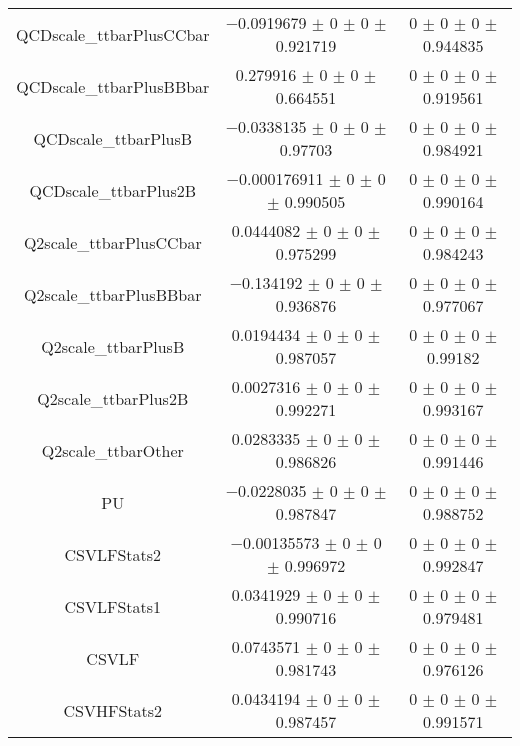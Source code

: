 \begin{table}
\begin{tabular}{ccc}
QCDscale\_ttbarPlusCCbar & \num{-0.0919679} $\pm$ \num{0} $\pm$ \num{0} $\pm$ \num{0.921719} & \num{0} $\pm$ \num{0} $\pm$ \num{0} $\pm$ \num{0.944835}\\
QCDscale\_ttbarPlusBBbar & \num{0.279916} $\pm$ \num{0} $\pm$ \num{0} $\pm$ \num{0.664551} & \num{0} $\pm$ \num{0} $\pm$ \num{0} $\pm$ \num{0.919561}\\
QCDscale\_ttbarPlusB & \num{-0.0338135} $\pm$ \num{0} $\pm$ \num{0} $\pm$ \num{0.97703} & \num{0} $\pm$ \num{0} $\pm$ \num{0} $\pm$ \num{0.984921}\\
QCDscale\_ttbarPlus2B & \num{-0.000176911} $\pm$ \num{0} $\pm$ \num{0} $\pm$ \num{0.990505} & \num{0} $\pm$ \num{0} $\pm$ \num{0} $\pm$ \num{0.990164}\\
Q2scale\_ttbarPlusCCbar & \num{0.0444082} $\pm$ \num{0} $\pm$ \num{0} $\pm$ \num{0.975299} & \num{0} $\pm$ \num{0} $\pm$ \num{0} $\pm$ \num{0.984243}\\
Q2scale\_ttbarPlusBBbar & \num{-0.134192} $\pm$ \num{0} $\pm$ \num{0} $\pm$ \num{0.936876} & \num{0} $\pm$ \num{0} $\pm$ \num{0} $\pm$ \num{0.977067}\\
Q2scale\_ttbarPlusB & \num{0.0194434} $\pm$ \num{0} $\pm$ \num{0} $\pm$ \num{0.987057} & \num{0} $\pm$ \num{0} $\pm$ \num{0} $\pm$ \num{0.99182}\\
Q2scale\_ttbarPlus2B & \num{0.0027316} $\pm$ \num{0} $\pm$ \num{0} $\pm$ \num{0.992271} & \num{0} $\pm$ \num{0} $\pm$ \num{0} $\pm$ \num{0.993167}\\
Q2scale\_ttbarOther & \num{0.0283335} $\pm$ \num{0} $\pm$ \num{0} $\pm$ \num{0.986826} & \num{0} $\pm$ \num{0} $\pm$ \num{0} $\pm$ \num{0.991446}\\
PU & \num{-0.0228035} $\pm$ \num{0} $\pm$ \num{0} $\pm$ \num{0.987847} & \num{0} $\pm$ \num{0} $\pm$ \num{0} $\pm$ \num{0.988752}\\
CSVLFStats2 & \num{-0.00135573} $\pm$ \num{0} $\pm$ \num{0} $\pm$ \num{0.996972} & \num{0} $\pm$ \num{0} $\pm$ \num{0} $\pm$ \num{0.992847}\\
CSVLFStats1 & \num{0.0341929} $\pm$ \num{0} $\pm$ \num{0} $\pm$ \num{0.990716} & \num{0} $\pm$ \num{0} $\pm$ \num{0} $\pm$ \num{0.979481}\\
CSVLF & \num{0.0743571} $\pm$ \num{0} $\pm$ \num{0} $\pm$ \num{0.981743} & \num{0} $\pm$ \num{0} $\pm$ \num{0} $\pm$ \num{0.976126}\\
CSVHFStats2 & \num{0.0434194} $\pm$ \num{0} $\pm$ \num{0} $\pm$ \num{0.987457} & \num{0} $\pm$ \num{0} $\pm$ \num{0} $\pm$ \num{0.991571}\\

\end{tabular}
\end{table}

